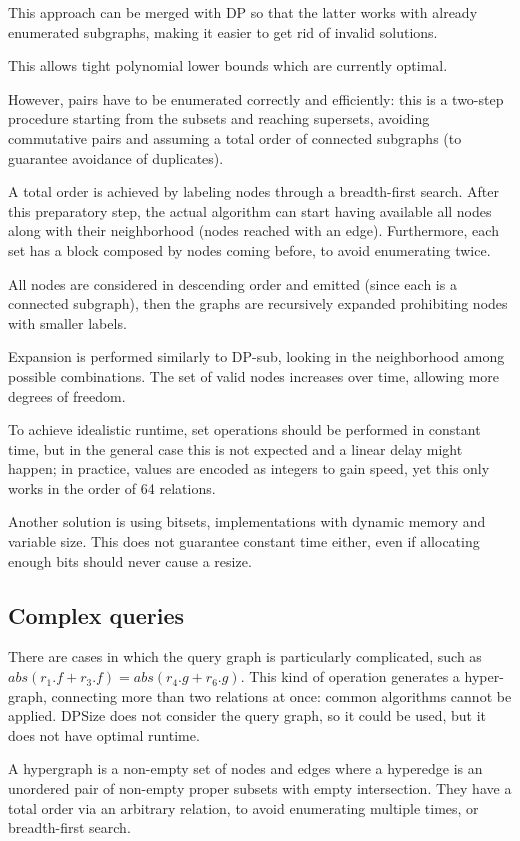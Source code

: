 This approach can be merged with DP so that the latter works with already enumerated subgraphs, making it easier to get rid of invalid solutions.

This allows tight polynomial lower bounds which are currently optimal. 

However, pairs have to be enumerated correctly and efficiently: this is a two-step procedure starting from the subsets and reaching supersets, avoiding commutative pairs and assuming a total order of connected subgraphs (to guarantee avoidance of duplicates).

A total order is achieved by labeling nodes through a breadth-first search. After this preparatory step, the actual algorithm can start having available all nodes along with their neighborhood (nodes reached with an edge). Furthermore, each set has a block composed by nodes coming before, to avoid enumerating twice.

All nodes are considered in descending order and emitted (since each is a connected subgraph), then the graphs are recursively expanded prohibiting nodes with smaller labels. 

Expansion is performed similarly to DP-sub, looking in the neighborhood among possible combinations. The set of valid nodes increases over time, allowing more degrees of freedom.

To achieve idealistic runtime, set operations should be performed in constant time, but in the general case this is not expected and a linear delay might happen; in practice, values are encoded as integers to gain speed, yet this only works in the order of 64 relations.

Another solution is using bitsets, implementations with dynamic memory and variable size. This does not guarantee constant time either, even if allocating enough bits should never cause a resize.

\subsection{Complex queries}
There are cases in which the query graph is particularly complicated, such as $abs(r_1.f + r_3.f) = abs(r_4.g + r_6.g)$. This kind of operation generates a hyper-graph, connecting more than two relations at once: common algorithms cannot be applied. DPSize does not consider the query graph, so it could be used, but it does not have optimal runtime.

A hypergraph is a non-empty set of nodes and edges where a hyperedge is an unordered pair of non-empty proper subsets with empty intersection. They have a total order via an arbitrary relation, to avoid enumerating multiple times, or breadth-first search.

